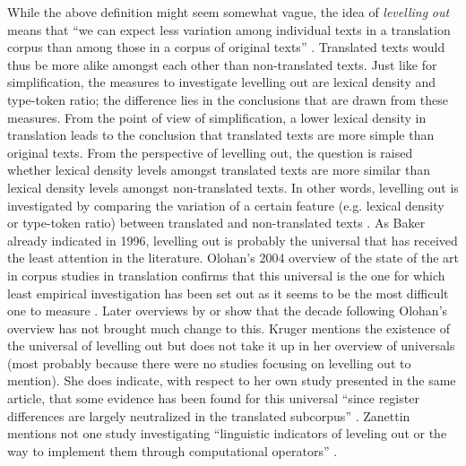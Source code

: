 While the above definition might seem somewhat vague, the idea of \textit{levelling} \textit{out} means that “we can expect less variation among individual texts in a translation corpus than among those in a corpus of original texts” \citep[177]{baker_corpus-based_1996}. Translated texts would thus be more alike amongst each other than non-translated texts. Just like for simplification, the measures to investigate levelling out are lexical density and type-token ratio; the difference lies in the conclusions that are drawn from these measures. From the point of view of simplification, a lower lexical density in translation leads to the conclusion that translated texts are more simple than original texts. From the perspective of levelling out, the question is raised whether lexical density levels amongst translated texts are more similar than lexical density levels amongst non-translated texts. In other words, levelling out is investigated by comparing the variation of a certain feature (e.g. lexical density or type-token ratio) between translated and non-translated texts \citep[184]{baker_corpus-based_1996}. As Baker already indicated in 1996, levelling out is probably the universal that has received the least attention in the literature. Olohan’s 2004 overview of the state of the art in corpus studies in translation confirms that this universal is the one for which least empirical investigation has been set out as it seems to be the most difficult one to measure \citep[100]{Olohan2004}. Later overviews by \citet{Kruger2012} or \citet{zanettin_corpus_2013} show that the decade following Olohan’s overview has not brought much change to this. Kruger mentions the existence of the universal of levelling out but does not take it up in her overview of universals (most probably because there were no studies focusing on levelling out to mention). She does indicate, with respect to her own study presented in the same article, that some evidence has been found for this universal “since register differences are largely neutralized in the translated subcorpus” \citep[369]{Kruger2012}. Zanettin mentions not one study investigating “linguistic indicators of leveling out or the way to implement them through computational operators” \citep[23]{zanettin_corpus_2013}.

